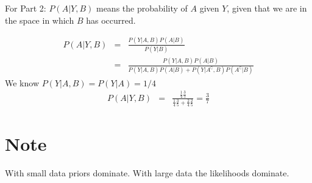 \documentclass{article}
\newcommand{\ber}{\begin{eqnarray}}
\newcommand{\eer}{\end{eqnarray}}
\begin{document}
For Part 2: $P(A|Y,B)$ means the probability of $A$ given $Y$, given that we are in the space in which $B$ has occurred.

\ber
P(A|Y,B) &=& \frac{P(Y|A,B)P(A|B)}{P(Y|B)} \\
&=& \frac{P(Y|A,B)P(A|B)}{P(Y|A,B)P(A|B) + P(Y|A^\complement,B)P(A^\complement|B)}
\eer
We know $P(Y|A,B)=P(Y|A)=1/4$
\ber
P(A|Y,B) &=& \frac{\frac{1}{4}\frac{3}{5}}{\frac{1}{4}\frac{3}{5} + \frac{2}{4}\frac{2}{5}} = \frac{3}{7}
\eer
\section{Note}
With small data priors dominate. With large data the likelihoods dominate.
\end{document}
